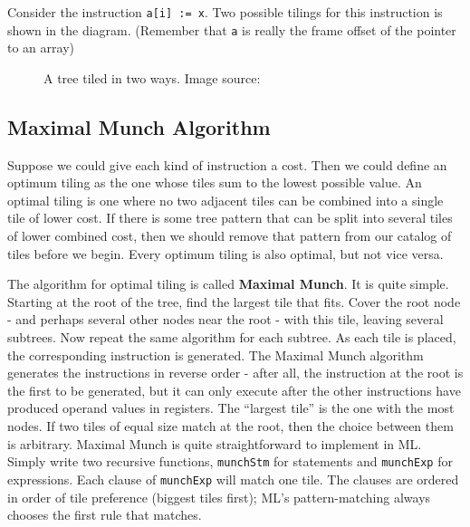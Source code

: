 Consider the instruction
\texttt{a[i] := x}.
Two possible tilings for this instruction is shown in the diagram.
(Remember that
\texttt{a} is
really the frame offset of the pointer to an array)

\begin{figure}
\centering
{}
\caption{A tree tiled in two ways. Image source: \cite{tigerbook}}
\end{figure}

\hypertarget{maximal-munch-algorithm}{%
\subsection{Maximal Munch Algorithm}\label{maximal-munch-algorithm}}

Suppose we could give each kind of instruction a cost. Then we could
define an optimum tiling as the one whose tiles sum to the lowest
possible value. An optimal tiling is one where no two adjacent tiles can
be combined into a single tile of lower cost. If there is some tree
pattern that can be split into several tiles of lower combined cost,
then we should remove that pattern from our catalog of tiles before we
begin. Every optimum tiling is also optimal, but not vice versa.

The algorithm for optimal tiling is called \textbf{Maximal Munch}. It is
quite simple. Starting at the root of the tree, find the largest tile
that fits. Cover the root node - and perhaps several other nodes near
the root - with this tile, leaving several subtrees. Now repeat the same
algorithm for each subtree. As each tile is placed, the corresponding
instruction is generated. The Maximal Munch algorithm generates the
instructions in reverse order - after all, the instruction at the root
is the first to be generated, but it can only execute after the other
instructions have produced operand values in registers. The ``largest
tile'' is the one with the most nodes. If two tiles of equal size match
at the root, then the choice between them is arbitrary. Maximal Munch is
quite straightforward to implement in ML. Simply write two recursive
functions,
\texttt{munchStm}
for statements and
\texttt{munchExp}
for expressions. Each clause of
\texttt{munchExp}
will match one tile. The clauses are ordered in order of tile preference
(biggest tiles first); ML's pattern-matching always chooses the first
rule that matches.

